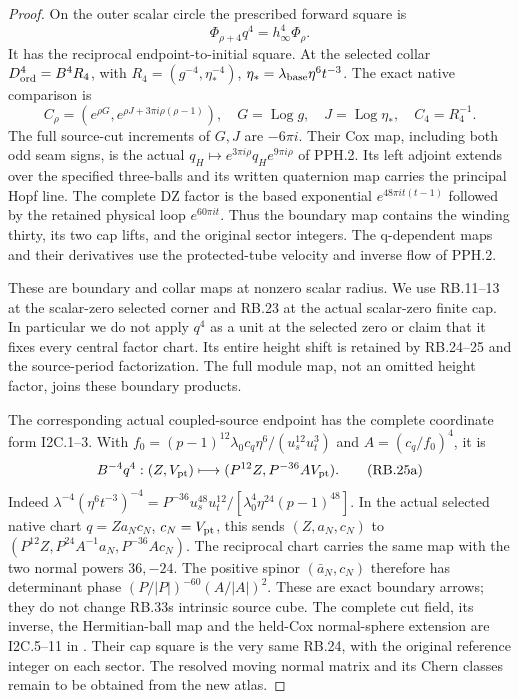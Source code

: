 \begin{proof}
On the outer scalar circle the prescribed forward square is
\[
 \Phi_{\rho+4}q^4=h_\infty^4\Phi_\rho.
 \tag{RB.24}
\]
It has the reciprocal endpoint-to-initial square. At the selected
collar \(D_{\rm ord}^4=B^4R_4\), with
\(R_4=(g^{-4},\eta_*^{-4})\),
\(\eta_*=\lambda_{\rm base}\eta^6t^{-3}\). The exact native
comparison is
\[
 C_\rho=(e^{\rho G},e^{\rho J+3\pi i\rho(\rho-1)}),
 \quad G=\operatorname{Log}g,\quad J=\operatorname{Log}\eta_*,
 \quad C_4=R_4^{-1}.
 \tag{RB.25}
\]
The full source-cut increments of \(G,J\) are \(-6\pi i\).
Their Cox map, including both odd seam signs, is the actual
\(q_H\mapsto e^{3\pi i\rho}q_He^{9\pi i\rho}\) of PPH.2.
Its left adjoint extends over the specified three-balls and its
written quaternion map carries the principal Hopf line. The complete
DZ factor is the based exponential \(e^{48\pi it(t-1)}\) followed
by the retained physical loop \(e^{60\pi it}\). Thus the boundary
map contains the winding thirty, its two cap lifts, and the original
sector integers. The q-dependent maps and their derivatives use the
protected-tube velocity and inverse flow of PPH.2.

These are boundary and collar maps at nonzero scalar radius. We use
RB.11--13 at the scalar-zero selected corner and RB.23 at the actual
scalar-zero finite cap. In particular we do not apply \(q^4\) as
a unit at the selected zero or claim that it fixes every central
factor chart. Its entire height shift is retained by RB.24--25 and
the source-period factorization. The full module map, not an omitted
height factor, joins these boundary products.

The corresponding actual coupled-source endpoint has the complete
coordinate form I2C.1--3. With
\(f_0=(p-1)^{12}\lambda_0c_q\eta^6/(u_s^{12}u_t^3)\) and
\(A=(c_q/f_0)^4\), it is
\[
 B^{-4}q^4:(Z,V_{\rm pt})\longmapsto
                   (P^{12}Z,P^{-36}A V_{\rm pt}).
 \tag{RB.25a}
\]
Indeed \(\lambda^{-4}(\eta^6t^{-3})^{-4}
=P^{-36}u_s^{48}u_t^{12}/
[\lambda_0^4\eta^{24}(p-1)^{48}]\). In the actual selected
native chart \(q=Za_Nc_N\), \(c_N=V_{\rm pt}\), this sends
\((Z,a_N,c_N)\) to
\((P^{12}Z,P^{24}A^{-1}a_N,P^{-36}Ac_N)\).
The reciprocal chart carries the same map with the two normal
powers \(36,-24\). The positive spinor \((\bar a_N,c_N)\)
therefore has determinant phase \((P/|P|)^{-60}(A/|A|)^2\).
These are exact boundary arrows; they do not change RB.33\textquotesingle s
intrinsic source cube. The complete cut field, its inverse, the
Hermitian-ball map and the held-Cox normal-sphere extension are
I2C.5--11 in
.
Their cap square is the very same RB.24, with the original
reference integer on each sector. The resolved moving normal
matrix and its Chern classes remain to be obtained from the
new atlas.


\end{proof}
